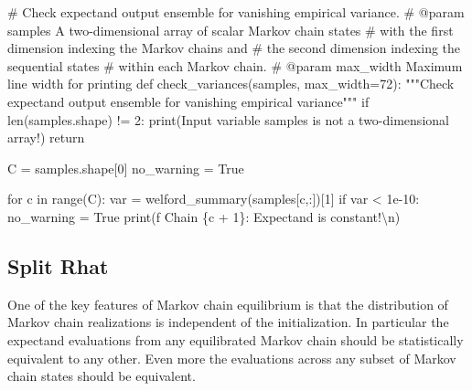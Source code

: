 \documentclass[
  letterpaper,
  DIV=11,
  numbers=noendperiod]{scrartcl}
\newenvironment{Shaded}{\begin{snugshade}}{\end{snugshade}}
\newcommand{\BuiltInTok}[1]{\textcolor[rgb]{0.00,0.23,0.31}{#1}}
\newcommand{\CharTok}[1]{\textcolor[rgb]{0.13,0.47,0.30}{#1}}
\newcommand{\CommentTok}[1]{\textcolor[rgb]{0.37,0.37,0.37}{#1}}
\newcommand{\ControlFlowTok}[1]{\textcolor[rgb]{0.00,0.23,0.31}{#1}}
\newcommand{\DecValTok}[1]{\textcolor[rgb]{0.68,0.00,0.00}{#1}}
\newcommand{\FloatTok}[1]{\textcolor[rgb]{0.68,0.00,0.00}{#1}}
\newcommand{\KeywordTok}[1]{\textcolor[rgb]{0.00,0.23,0.31}{#1}}
\newcommand{\NormalTok}[1]{\textcolor[rgb]{0.00,0.23,0.31}{#1}}
\newcommand{\OperatorTok}[1]{\textcolor[rgb]{0.37,0.37,0.37}{#1}}
\newcommand{\SpecialCharTok}[1]{\textcolor[rgb]{0.37,0.37,0.37}{#1}}
\newcommand{\SpecialStringTok}[1]{\textcolor[rgb]{0.13,0.47,0.30}{#1}}
\newcommand{\StringTok}[1]{\textcolor[rgb]{0.13,0.47,0.30}{#1}}
\newcommand{\VariableTok}[1]{\textcolor[rgb]{0.07,0.07,0.07}{#1}}
\begin{document}
\begin{Shaded}
\begin{Highlighting}[]
\CommentTok{\# Check expectand output ensemble for vanishing empirical variance.}
\CommentTok{\# @param samples A two{-}dimensional array of scalar Markov chain states }
\CommentTok{\#                with the first dimension indexing the Markov chains and }
\CommentTok{\#                the second dimension indexing the sequential states }
\CommentTok{\#                within each Markov chain.}
\CommentTok{\# @param max\_width Maximum line width for printing}
\KeywordTok{def}\NormalTok{ check\_variances(samples, max\_width}\OperatorTok{=}\DecValTok{72}\NormalTok{):}
  \CommentTok{"""Check expectand output ensemble for vanishing empirical variance"""}
  \ControlFlowTok{if} \BuiltInTok{len}\NormalTok{(samples.shape) }\OperatorTok{!=} \DecValTok{2}\NormalTok{:}
    \BuiltInTok{print}\NormalTok{(}\StringTok{\textquotesingle{}Input variable \textasciigrave{}samples\textasciigrave{} is not a two{-}dimensional array!\textquotesingle{}}\NormalTok{)}
    \ControlFlowTok{return}
  
\NormalTok{  C }\OperatorTok{=}\NormalTok{ samples.shape[}\DecValTok{0}\NormalTok{]}
\NormalTok{  no\_warning }\OperatorTok{=} \VariableTok{True}
  
  \ControlFlowTok{for}\NormalTok{ c }\KeywordTok{in} \BuiltInTok{range}\NormalTok{(C):}
\NormalTok{    var }\OperatorTok{=}\NormalTok{ welford\_summary(samples[c,:])[}\DecValTok{1}\NormalTok{]}
    \ControlFlowTok{if}\NormalTok{ var }\OperatorTok{\textless{}} \FloatTok{1e{-}10}\NormalTok{:}
\NormalTok{      no\_warning }\OperatorTok{=} \VariableTok{True}
      \BuiltInTok{print}\NormalTok{(}\SpecialStringTok{f\textquotesingle{}  Chain }\SpecialCharTok{\{}\NormalTok{c }\OperatorTok{+} \DecValTok{1}\SpecialCharTok{\}}\SpecialStringTok{: Expectand is constant!}\CharTok{\textbackslash{}n}\SpecialStringTok{\textquotesingle{}}\NormalTok{)}
\end{Highlighting}
\end{Shaded}

\hypertarget{split-rhat}{%
\subsection{Split Rhat}\label{split-rhat}}

One of the key features of Markov chain equilibrium is that the
distribution of Markov chain realizations is independent of the
initialization. In particular the expectand evaluations from any
equilibrated Markov chain should be statistically equivalent to any
other. Even more the evaluations across any subset of Markov chain
states should be equivalent.
\end{document}
